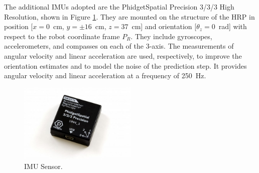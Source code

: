 The additional \glspl{IMU} adopted are the PhidgetSpatial Precision 3/3/3 High Resolution, shown in Figure \ref{fig:spatial}.
They are mounted on the structure of the \gls{HRP} in position [$x=0$\SI{}{cm}, $y=\pm16$\SI{}{cm}, $z= 37$\SI{}{cm}] and orientation [$\theta_z=0$\SI{}{rad}] with respect to the robot coordinate frame $P_R$.
They include gyroscopes, accelerometers, and compasses on each of the 3-axis.
The measurements of angular velocity and linear acceleration are used, respectively, to improve the orientation estimates and to model the noise of the prediction step.
It provides angular velocity and linear acceleration at a frequency of \SI{250}{Hz}.
\begin{figure}[!ht]
	\begin{center}
			\begin{center}
				\includegraphics[width=0.5\textwidth]{Images/4-Methods/1044_1B.jpg}
			\end{center}
			\caption{IMU Sensor.}
			\label{fig:spatial}
	\end{center}
\end{figure}




